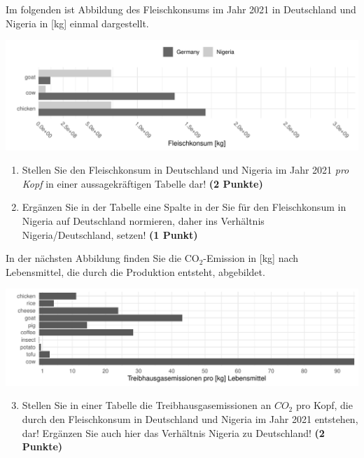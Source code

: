 \documentclass[a4paper, 9pt]{scrartcl}\usepackage[]{graphicx}\usepackage[]{xcolor}
\makeatletter
\def\maxwidth{ %
  \ifdim\Gin@nat@width>\linewidth
    \linewidth
  \else
    \Gin@nat@width
  \fi
}
\newenvironment{knitrout}{}{} %
\makeatother
\begin{document}
Im folgenden ist Abbildung des Fleischkonsums im Jahr 2021 in
Deutschland und Nigeria in [kg] einmal dargestellt. 

\begin{knitrout}
\color{fgcolor}

{\centering \includegraphics[width=\maxwidth]{img/math-14-a-1} 

}


\end{knitrout}
  
\begin{enumerate}
\item Stellen Sie den Fleischkonsum in Deutschland und Nigeria im Jahr
  2021 \textit{pro Kopf} in einer aussagekr{\"a}ftigen Tabelle dar! 
  \textbf{(2 Punkte)}
\item Erg{\"a}nzen Sie in der Tabelle eine Spalte in der Sie f{\"u}r den
  Fleischkonsum in Nigeria auf Deutschland normieren, daher ins Verh{\"a}ltnis
  Nigeria/Deutschland, setzen! \textbf{(1 Punkt)}
\end{enumerate}

In der n{\"a}chsten Abbildung finden Sie die CO$_2$-Emission in [kg] nach
Lebensmittel, die durch die Produktion entsteht, abgebildet.

\begin{knitrout}
\color{fgcolor}

{\centering \includegraphics[width=\maxwidth]{img/math-14-b-1} 

}


\end{knitrout}

\begin{enumerate}
  \setcounter{enumi}{2}  
\item Stellen Sie in einer Tabelle die Treibhausgasemissionen an $CO_2$ pro
  Kopf, die durch den Fleischkonsum in Deutschland und Nigeria im Jahr
  2021 entstehen, dar! Erg{\"a}nzen Sie auch hier das Verh{\"a}ltnis
  Nigeria zu Deutschland! \textbf{(2 Punkte)}
\end{enumerate}
\end{document}
